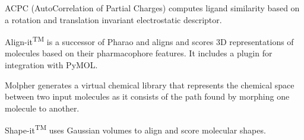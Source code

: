 ACPC (AutoCorrelation of Partial Charges) \cite{Berenger_2014} computes ligand similarity based on a rotation and translation invariant electrostatic descriptor.

Align-it\textsuperscript{TM} is a successor of Pharao \cite{Taminau_2008} and aligns and scores 3D representations of molecules based on their pharmacophore features.  It includes a plugin for integration with PyMOL.

Molpher  \cite{Hoksza_2014} generates a virtual chemical library that represents the chemical space between two input molecules as it consists of the path found by morphing one molecule to another.


Shape-it\textsuperscript{TM} uses Gaussian volumes to align and score molecular shapes.



